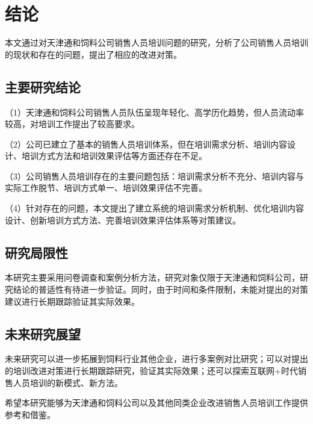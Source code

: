 \section{结论}

本文通过对天津通和饲料公司销售人员培训问题的研究，分析了公司销售人员培训的现状和存在的问题，提出了相应的改进对策。

\subsection{主要研究结论}

（1）天津通和饲料公司销售人员队伍呈现年轻化、高学历化趋势，但人员流动率较高，对培训工作提出了较高要求。

（2）公司已建立了基本的销售人员培训体系，但在培训需求分析、培训内容设计、培训方式方法和培训效果评估等方面还存在不足。

（3）公司销售人员培训存在的主要问题包括：培训需求分析不充分、培训内容与实际工作脱节、培训方式单一、培训效果评估不完善。

（4）针对存在的问题，本文提出了建立系统的培训需求分析机制、优化培训内容设计、创新培训方式方法、完善培训效果评估体系等对策建议。

\subsection{研究局限性}

本研究主要采用问卷调查和案例分析方法，研究对象仅限于天津通和饲料公司，研究结论的普适性有待进一步验证。同时，由于时间和条件限制，未能对提出的对策建议进行长期跟踪验证其实际效果。

\subsection{未来研究展望}

未来研究可以进一步拓展到饲料行业其他企业，进行多案例对比研究；可以对提出的培训改进对策进行长期跟踪研究，验证其实际效果；还可以探索互联网+时代销售人员培训的新模式、新方法。

希望本研究能够为天津通和饲料公司以及其他同类企业改进销售人员培训工作提供参考和借鉴。
